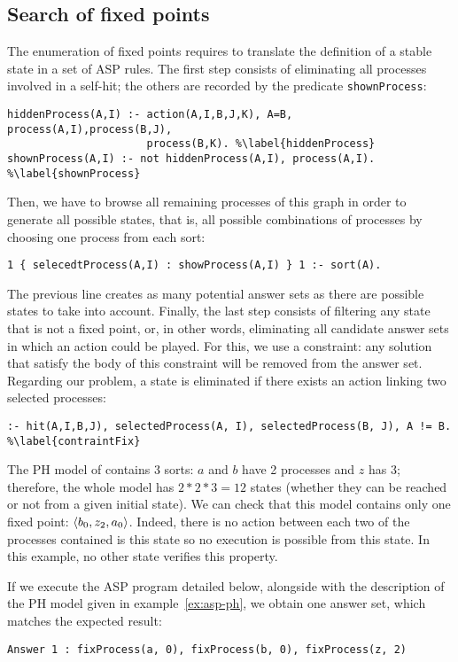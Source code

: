 \subsection{Search of fixed points}

The enumeration of fixed points requires to translate the definition of a stable state
in a set of ASP rules.
The first step consists of eliminating all processes involved in a self-hit;
the others are recorded by the predicate \texttt{shownProcess}:
\begin{lstlisting}
hiddenProcess(A,I) :- action(A,I,B,J,K), A=B, process(A,I),process(B,J),
                      process(B,K). %\label{hiddenProcess}
shownProcess(A,I) :- not hiddenProcess(A,I), process(A,I). %\label{shownProcess}
\end{lstlisting}
Then, we have to browse all remaining processes of this graph
in order to generate all possible states,
that is, all possible combinations of processes by choosing one process from each sort:
\begin{lstlisting}
1 { selecedtProcess(A,I) : showProcess(A,I) } 1 :- sort(A).
\end{lstlisting}
The previous line creates as many potential answer sets as there are possible states
to take into account.
Finally, the last step consists of filtering any state that is not a fixed point,
or, in other words, eliminating all candidate answer sets in which an action could be played.
For this, we use a constraint:
any solution that satisfy the body of this constraint will be removed from the answer set.
Regarding our problem, a state is eliminated if there exists an action linking two selected processes:
\begin{lstlisting}
:- hit(A,I,B,J), selectedProcess(A, I), selectedProcess(B, J), A != B. %\label{contraintFix}
\end{lstlisting}

\begin{example}
The PH model of  contains 3 sorts:
$a$ and $b$ have 2 processes and $z$ has 3; therefore, the whole model has $2*2*3 = 12$ states (whether they can be reached or not from a given initial state).
We can check that this model contains only one fixed point: $\langle b_0, z_2, a_0 \rangle$.
Indeed, there is no action between each two of the processes contained is this state so no execution is possible from this state. 
In this example, no other state verifies this property.

If we execute the ASP program detailed below,
alongside with the description of the PH model given in example~\ref{ex:asp-ph},
we obtain one answer set, which matches the expected result:
\begin{lstlisting}[numbers=none]
Answer 1 : fixProcess(a, 0), fixProcess(b, 0), fixProcess(z, 2)
\end{lstlisting}
\end{example}